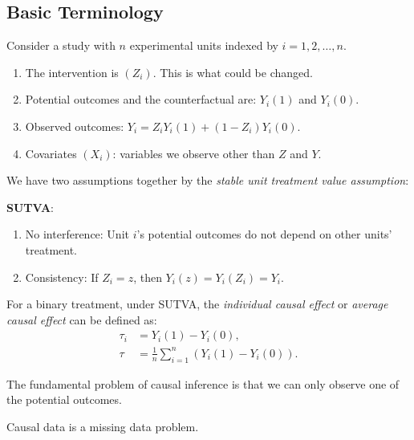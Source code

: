 \documentclass[12pt]{article}
\begin{document}
\subsection{Basic Terminology}%
\label{sub:bt}

Consider a study with $n$ experimental units indexed by $i = 1, 2, \ldots, n$.
\begin{enumerate}
	\item The intervention is $(Z_i)$. This is what could be changed.
	\item Potential outcomes and the counterfactual are: $Y_i(1)$ and $Y_i(0)$.
	\item Observed outcomes: $Y_i = Z_i Y_i(1) + (1 - Z_i)Y_i(0)$.
	\item Covariates $(X_i)$: variables we observe other than $Z$ and $Y$.
\end{enumerate}

We have two assumptions together by the \emph{stable unit treatment value assumption}:

\textbf{SUTVA}:
\begin{enumerate}
	\item No interference: Unit $i$'s potential outcomes do not depend on other units' treatment.
	\item Consistency: If $Z_i = z$, then $Y_i(z) = Y_i(Z_i) = Y_i$.
\end{enumerate}

For a binary treatment, under SUTVA, the \emph{individual causal effect} or \emph{average causal effect} can be defined as:
\begin{align*}
	\tau_i &= Y_i(1) - Y_i(0), \\
	\tau &= \frac 1n \sum_{i = 1}^n (Y_i(1) - Y_i(0)).
\end{align*}

The fundamental problem of causal inference is that we can only observe one of the potential outcomes.

Causal data is a missing data problem.


\newpage

\printindex
\end{document}
